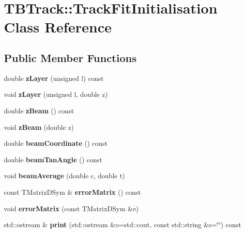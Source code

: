 \section{T\-B\-Track\-:\-:Track\-Fit\-Initialisation Class Reference}
\label{classTBTrack_1_1TrackFitInitialisation}
\subsection*{Public Member Functions}
\begin{DoxyCompactItemize}
\item 
double {\bfseries z\-Layer} (unsigned l) const \label{classTBTrack_1_1TrackFitInitialisation_a01665c12db631dd5eceddd77bfe937e6}

\item 
void {\bfseries z\-Layer} (unsigned l, double z)\label{classTBTrack_1_1TrackFitInitialisation_afc1e65452855b3cd19aa5acb48e864f9}

\item 
double {\bfseries z\-Beam} () const \label{classTBTrack_1_1TrackFitInitialisation_a6bc7c5714057b2e01c19af17c1796ba2}

\item 
void {\bfseries z\-Beam} (double z)\label{classTBTrack_1_1TrackFitInitialisation_ae22fc580faa11890119c02707405bd07}

\item 
double {\bfseries beam\-Coordinate} () const \label{classTBTrack_1_1TrackFitInitialisation_a05f677ed046915cf6f8b82a854af182f}

\item 
double {\bfseries beam\-Tan\-Angle} () const \label{classTBTrack_1_1TrackFitInitialisation_a7524b68beb3cacf9b185ae4ea7e1a81d}

\item 
void {\bfseries beam\-Average} (double c, double t)\label{classTBTrack_1_1TrackFitInitialisation_a85507e913f3ff19274ad60673de58bdd}

\item 
const T\-Matrix\-D\-Sym \& {\bfseries error\-Matrix} () const \label{classTBTrack_1_1TrackFitInitialisation_ac7b30c88b39f27e822c33ea02876cfbb}

\item 
void {\bfseries error\-Matrix} (const T\-Matrix\-D\-Sym \&e)\label{classTBTrack_1_1TrackFitInitialisation_a12579080a3daa8d4dd257f7cf06e0754}

\item 
std\-::ostream \& {\bfseries print} (std\-::ostream \&o=std\-::cout, const std\-::string \&s=\char`\"{}\char`\"{}) const \label{classTBTrack_1_1TrackFitInitialisation_a3e2634a59a5ed407409f708755abdcea}

\end{DoxyCompactItemize}
